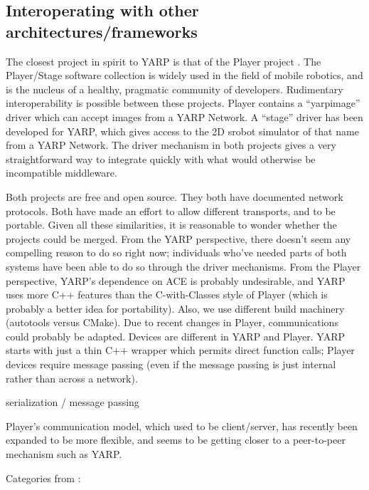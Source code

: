 \subsection{Interoperating with other architectures/frameworks}

The closest project in spirit to YARP is that of the Player project
\cite{vaughan2006reusable}.  The Player/Stage software collection is 
widely used in the field of mobile robotics, and is the nucleus of
a healthy, pragmatic community of developers.  
%
Rudimentary interoperability is possible between these projects.
Player contains a ``yarpimage'' driver which can accept images
from a YARP Network.  A ``stage'' driver has been developed
for YARP, which gives access to the 2D srobot simulator of that
name from a YARP Network.
%
The driver mechanism in both projects gives a very straightforward way
to integrate quickly with what would otherwise be incompatible
middleware.

Both projects are free and open source.  They both have documented
network protocols.  Both have made an effort to allow different
transports, and to be portable.  Given all these similarities,
it is reasonable to wonder whether the projects could be merged.
%
From the YARP perspective, there doesn't seem any compelling reason to
do so right now; individuals who've needed parts of both systems have
been able to do so through the driver mechanisms.
%
From the Player perspective, YARP's dependence on ACE is probably
undesirable, and YARP uses more C++ features than the C-with-Classes
style of Player (which is probably a better idea for portability).
Also, we use different build machinery (autotools versus CMake).
%
Due to recent changes in Player, communications could probably be
adapted.  Devices are different in YARP and Player.  YARP starts
with just a thin C++ wrapper which permits direct function calls;
Player devices require message passing (even if the message passing
is just internal rather than across a network).


serialization / message passing

Player's communication model,
which used to be client/server, has recently been expanded to
be more flexible, and seems to be getting closer to a peer-to-peer
mechanism such as YARP.



Categories from \cite{collett2005player}:


